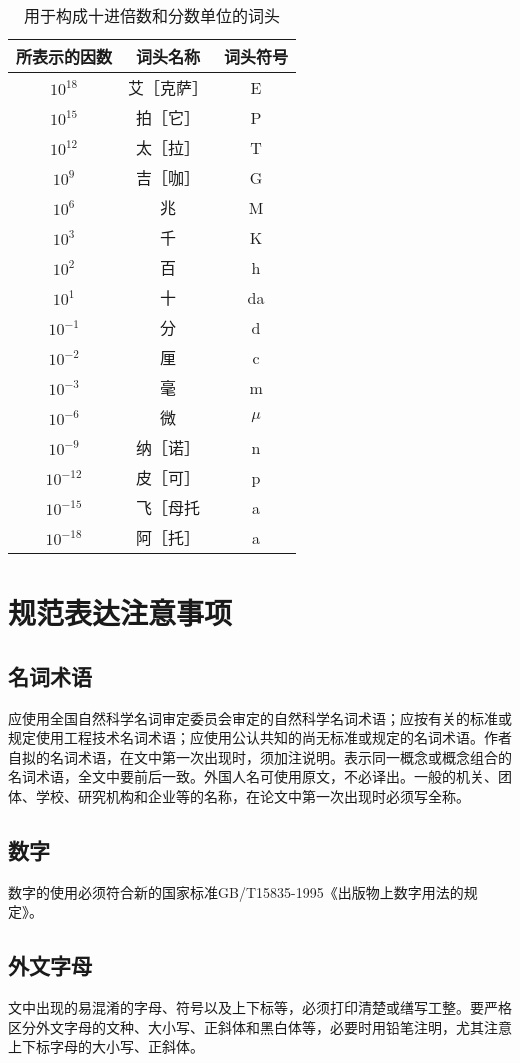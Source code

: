 \begin{table}
	\centering
	\song\wuhao
	\caption{用于构成十进倍数和分数单位的词头}
	\begin{tabular}{ccc}
	\hline
	所表示的因数&词头名称&词头符号\\
	\hline
	$10^{18}$&艾［克萨］&E\\
	$10^{15}$&拍［它］&P\\
	$10^{12}$&太［拉］&T\\
	$10^{9}$&吉［咖］&G\\
	$10^{6}$&兆&M\\
	$10^{3}$&千&K\\
	$10^{2}$&百&h\\
	$10^{1}$&十&da\\
	$10^{-1}$&分&d\\
	$10^{-2}$&厘&c\\
	$10^{-3}$&毫&m\\
	$10^{-6}$&微&$\mu$\\
	$10^{-9}$&纳［诺］&n\\
	$10^{-12}$&皮［可］&p\\
	$10^{-15}$&飞［母托&a\\
	$10^{-18}$&阿［托］&a\\
	\hline
	\end{tabular}
\end{table}

\section{规范表达注意事项}
\subsection{名词术语}
应使用全国自然科学名词审定委员会审定的自然科学名词术语；应按有关的标准或规定使用工程技术名词术语；应使用公认共知的尚无标准或规定的名词术语。作者自拟的名词术语，在文中第一次出现时，须加注说明。表示同一概念或概念组合的名词术语，全文中要前后一致。外国人名可使用原文，不必译出。一般的机关、团体、学校、研究机构和企业等的名称，在论文中第一次出现时必须写全称。

\subsection{数字}
数字的使用必须符合新的国家标准GB/T15835-1995《出版物上数字用法的规定》。

\subsection{外文字母}
文中出现的易混淆的字母、符号以及上下标等，必须打印清楚或缮写工整。要严格区分外文字母的文种、大小写、正斜体和黑白体等，必要时用铅笔注明，尤其注意上下标字母的大小写、正斜体。

